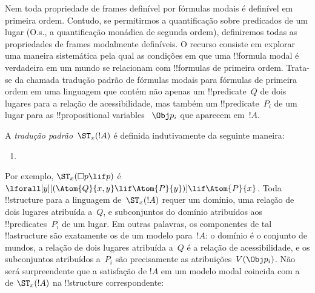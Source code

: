 \documentclass[../../../include/open-logic-section]{subfiles}
\begin{document}


Nem toda propriedade de frames definível por fórmulas modais é definível em
primeira ordem. Contudo, se permitirmos a quantificação sobre predicados de um
lugar (O.s.\@, a quantificação monádica de segunda ordem), definiremos todas
as propriedades de frames modalmente definíveis. O recurso consiste em
explorar uma maneira sistemática pela qual as condições em que uma
!!{formula} modal é verdadeira em um mundo se relacionam com !!{formula}s de
primeira ordem. Trata-se da chamada tradução padrão de fórmulas modais para
fórmulas de primeira ordem em uma linguagem que contém não apenas um
!!{predicate}~$Q$ de dois lugares para a relação de acessibilidade, mas também
um !!{predicate}~$P_i$ de um lugar para as !!{propositional variable}s
~$\Obj p_i$ que aparecem em~$!A$.

\begin{defn}
  A \emph{tradução padrão}~$\ST_x(!A)$ é definida indutivamente da seguinte
  maneira:
  \begin{enumerate}
  \item {}
  \end{enumerate}
\end{defn}

Por exemplo, $\ST_x(\Box p \lif p)$ é
$\lforall[y][(\Atom{Q}{x,y} \lif \Atom{P}{y})] \lif \Atom{P}{x}$. Toda
!!{structure} para a linguagem de~$\ST_x(!A)$ requer um domínio, uma relação
de dois lugares atribuída a~$Q$, e subconjuntos do domínio atribuídos aos
!!{predicate}s~$P_i$ de um lugar. Em outras palavras, os componentes de tal
!!a{structure} são exatamente os de um modelo para~$!A$: o domínio é o
conjunto de mundos, a relação de dois lugares atribuída a~$Q$ é a relação de
acessibilidade, e os subconjuntos atribuídos a~$P_i$ são precisamente as
atribuições~$V(\Obj p_i)$. Não será surpreendente que a satisfação de $!A$ em
um modelo modal coincida com a de $\ST_x(!A)$ na !!{structure}
correspondente:
\end{document}
